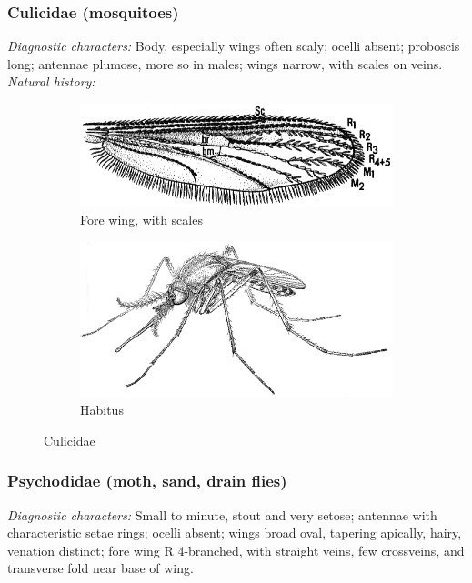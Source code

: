 \documentclass[letterpaper, 11pt]{article}
\begin{document}
\subsubsection{Culicidae (mosquitoes)}
\noindent{}\textit{Diagnostic characters:} Body, especially wings often scaly; ocelli absent; proboscis long; antennae plumose, more so in males; wings narrow, with scales on veins.\\

\noindent{}\textit{Natural history:} \\

\begin{figure}[ht!]
    \centering
    \begin{subfigure}[ht!]{0.45\textwidth}
        \includegraphics[width=\textwidth]{CulicidWing}
        \caption{Fore wing, with scales \citep[][Fig. 25.5]{mcalpine1981manual}}
        \label{fig:culic1}
    \end{subfigure}
    \qquad
    \begin{subfigure}[ht!]{0.45\textwidth}
        \includegraphics[width=\textwidth]{CulicidHabitus}
        \caption{Habitus \citep[][Fig. 25.1]{mcalpine1981manual}}
        \label{fig:culic2}
    \end{subfigure}
    \caption{Culicidae}\label{fig:culicids}
\end{figure}

\subsubsection{Psychodidae (moth, sand, drain flies)}
\noindent{}\textit{Diagnostic characters:} Small to minute, stout and very setose;  antennae with characteristic setae rings; ocelli absent; wings broad oval, tapering apically, hairy, venation distinct; fore wing R 4-branched, with straight veins, few crossveins, and transverse fold near base of wing.\\
\end{document}
